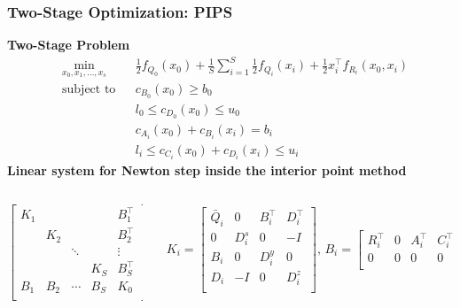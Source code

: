 \begin{frame}
  \frametitle{Two-Stage Optimization: PIPS}
  {\bf Two-Stage Problem}
\begin{equation}
  \begin{aligned}
    &\min\limits_{x_0,x_1,\dots,x_s} & & \frac{1}{2} f_{Q_0}(x_0) + 
    \frac{1}{S} \sum^{S}_{i=1} \frac{1}{2} f_{Q_i}(x_i) +  
    \frac{1}{2}x_i^{\intercal} f_{R_i}(x_0,x_i) \\
    &\mbox{subject to} & & c_{B_0}(x_0)\geq b_0 \\
    && & l_0 \leq c_{D_0}(x_0) \leq u_0 \\
    && & c_{A_i}(x_0) +c_{B_i}(x_i) = b_i \\
    && & l_i \leq c_{C_i}(x_0) + c_{D_i}(x_i) \leq u_i
  \end{aligned}
  \label{eq:opt}
  \nonumber
\end{equation}
    {\bf Linear system for Newton step inside the interior point method}
  \begin{columns}
    \begin{column}{0.3\textwidth}
  \begin{equation} 
    \left[ 
    \begin{array}{ccccc}
      K_1 & & & & B^{\intercal}_1 \\
      & K_2 & & & B^{\intercal}_2 \\
      & & \ddots & & \vdots \\
      & & & K_S & B^{\intercal}_S \\
      B_1 & B_2 & \cdots &B_S & K_0 \\
    \end{array} 
    \right] 
    \label{eq:linsys}
    \nonumber
  \end{equation} 
\end{column}
    \begin{column}{0.55\textwidth}
\[ 
\begin{array}{c}
K_i=
\left[ \begin{array}{cccc}
  \bar{Q}_i & 0 & B^{\intercal}_i & D^{\intercal}_i\\ 
  0 & D_i^s & 0 & -I \\
  B_i & 0 & D^y_i & 0 \\ 
  D_i & -I & 0 & D^z_i \\ 
\end{array} \right],\,
B_i=
\left[ \begin{array}{cccc}
  R^{\intercal}_i & 0 & A^{\intercal}_i & C^{\intercal}_i\\ 
  0 & 0 & 0 & 0 \\

\end{array}
\end{array}\]
\end{column}
\end{columns}
\end{frame}
